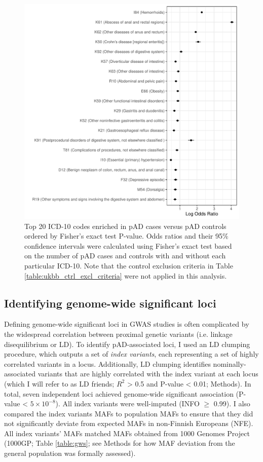\begin{figure}[H] 
  \centering    
  \includegraphics[width=1.0\textwidth]{pheno_enrich}
  \caption[ICD-10 codes enriched in pAD cases versus controls]{Top 20 ICD-10 codes enriched in pAD cases versus pAD controls ordered by Fisher's exact test P-value. Odds ratios and their 95\% confidence intervals were calculated using Fisher's exact test based on the number of pAD cases and controls with and without each particular ICD-10. Note that the control exclusion criteria in Table \ref{table:ukbb_ctrl_excl_criteria} were not applied in this analysis.}
  \label{fig:pheno_enrich}
  \end{figure}



  \subsection{Identifying genome-wide significant loci}
  Defining genome-wide significant loci in GWAS studies is often complicated by the widespread correlation between proximal genetic variants (i.e. linkage disequilibrium or LD). To identify pAD-associated loci, I used an LD clumping procedure, which outputs a set of \textit{index variants}, each representing a set of highly correlated variants in a locus. Additionally, LD clumping identifies nominally-associated variants that are highly correlated with the index variant at each locus (which I will refer to as LD friends; $R^{2}$ > 0.5 and P-value < 0.01; Methods). In total, seven independent loci achieved genome-wide significant association (P-value < $5\times10^{-8}$). All index variants were well-imputed (INFO $\geq$ 0.99). I also compared the index variants MAFs to population MAFs to ensure that they did not significantly deviate from expected MAFs in non-Finnish Europeans (NFE). All index variants' MAFs matched MAFs obtained from 1000 Genomes Project (1000GP; Table \ref{table:gws}; see Methods for how MAF deviation from the general population was formally assessed). 


